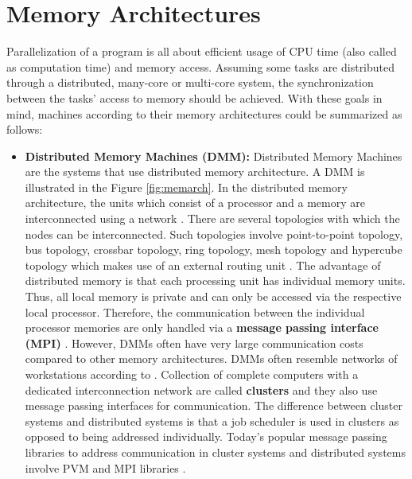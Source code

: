 \section{Memory Architectures} 
Parallelization of a program is all about efficient usage of CPU time (also called as computation time) and memory access. Assuming some tasks are distributed through a distributed, many-core or multi-core system, the synchronization between the tasks' access to memory should be achieved. With these goals in mind, machines according to their memory architectures could be summarized as follows:
\begin{itemize}
	\item \textbf{Distributed Memory Machines (DMM):} Distributed Memory Machines are the systems that use distributed memory architecture. A DMM is illustrated in the Figure \ref{fig:memarch}. In the distributed memory architecture, the units which consist of a processor and a memory are interconnected using a network \cite{springerparallel}. There are several topologies with which the nodes can be interconnected. Such topologies involve point-to-point topology, bus topology, crossbar topology, ring topology, mesh topology and hypercube topology which makes use of an external routing unit \cite{interconnection}. The advantage of distributed memory is that each processing unit has individual memory units. Thus, all local memory is private and can only be accessed via the respective local processor. Therefore, the communication between the individual processor memories are only handled via a \textbf{message passing interface (MPI)} \cite{springerparallel}. However, DMMs often have very large communication costs compared to other memory architectures. DMMs often resemble networks of workstations according to \cite{springerparallel}. Collection of complete computers with a dedicated interconnection network are called \textbf{clusters} and they also use message passing interfaces for communication. The difference between cluster systems and distributed systems is that a job scheduler is used in clusters as opposed to being addressed individually. Today's popular message passing libraries to address communication in cluster systems and distributed systems involve PVM and MPI libraries \cite{springerparallel}. 

\end{itemize}
